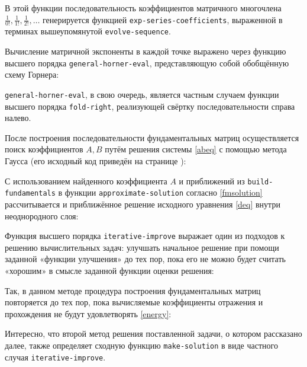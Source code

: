 \documentclass{article}
\newcommand{\procname}[1]{\texttt{#1}}
\numberwithin{equation}{section}
\begin{document}


В этой функции последовательность коэффициентов матричного многочлена
$\frac{1}{0!}, \frac{1}{1!}, \frac{1}{2!}, \dotsc$ генерируется
функцией \procname{exp-series-coefficients},
выраженной в терминах вышеупомянутой \procname{evolve-sequence}.

Вычисление матричной экспоненты в каждой точке выражено через
функцию высшего порядка \procname{general-horner-eval}, представляющую
собой обобщённую схему Горнера:



\procname{general-horner-eval}, в свою очередь, является частным случаем
функции высшего порядка \procname{fold-right}, реализующей свёртку
последовательности справа налево.

После построения последовательности фундаментальных матриц
осуществляется поиск коэффициентов $A, B$ путём решения системы
\eqref{abeq} с помощью метода Гаусса\nocite{bahvalov01} (его исходный код приведён на
странице \pageref{gauss.scm-full-listing}):



С использованием найденного коэффициента $A$ и приближений из
\procname{build-fundamentals} в функции
\procname{approximate-solution} согласно \eqref{fmsolution}
рассчитывается и приближённое решение исходного уравнения \eqref{deq}
внутри неоднородного слоя:



Функция высшего порядка \procname{iterative-improve} выражает один из
подходов к решению вычислительных задач: улучшать начальное решение
при помощи заданной «функции улучшения» до тех пор, пока его не можно
будет считать «хорошим» в смысле заданной функции оценки решения:



Так, в данном методе процедура построения фундаментальных матриц
повторяется до тех пор, пока вычисляемые коэффициенты отражения и
прохождения не будут удовлетворять \eqref{energy}:



Интересно, что второй метод решения поставленной задачи, о котором
рассказано далее, также определяет сходную функцию
\procname{make-solution} в виде частного случая
\procname{iterative-improve}.
\end{document}
